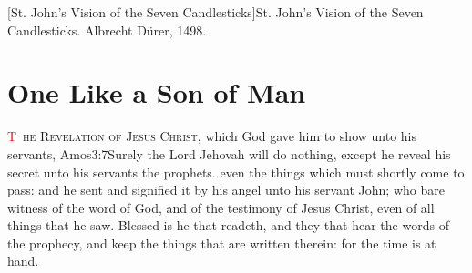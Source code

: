 [St. John's Vision of the Seven Candlesticks]{St. John's Vision of the Seven Candlesticks. Albrecht Dürer, 1498.}

\pagestyle{fancy}
\mainmatter
\trimFrame
\chapter{One Like a Son of Man}
\begingroup
\let\clearpage\relax
\endgroup
\lettrine[lines=3,nindent=-0.3em,loversize=0.05]{\textcolor{red}{T}}{\ he Revelation of Jesus Christ}, which God gave him to show unto his servants,%
			{Amos}{3:7}{Surely the Lord Jehovah will do nothing, except he reveal his secret unto his servants the prophets.}
 even the things which must shortly come to pass: and he sent and signified it by his angel unto his servant John; %
who bare witness of the word of God, and of the testimony of Jesus Christ, even of all things that he saw. %
Blessed is he that readeth, and they that hear the words of the prophecy, and keep the things that are written therein: for the time is at hand.
